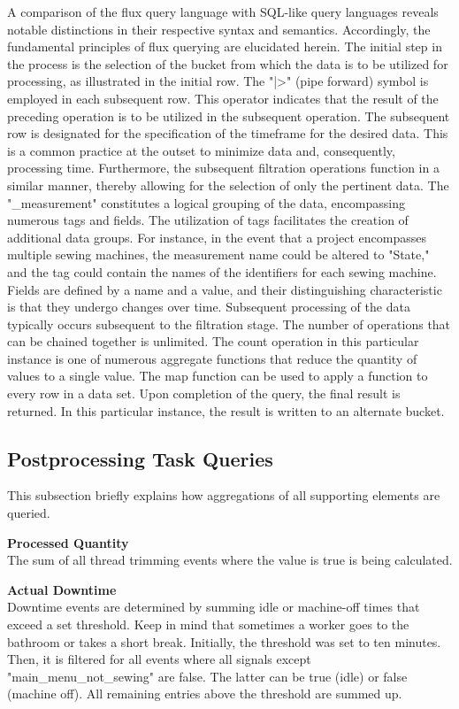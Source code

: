 A comparison of the flux query language with SQL-like query languages reveals notable distinctions in their respective syntax and semantics. Accordingly, the fundamental principles of flux querying are elucidated herein. The initial step in the process is the selection of the bucket from which the data is to be utilized for processing, as illustrated in the initial row. The "|>" (pipe forward) symbol is employed in each subsequent row. This operator indicates that the result of the preceding operation is to be utilized in the subsequent operation. The subsequent row is designated for the specification of the timeframe for the desired data. This is a common practice at the outset to minimize data and, consequently, processing time. Furthermore, the subsequent filtration operations function in a similar manner, thereby allowing for the selection of only the pertinent data. The "\_measurement" constitutes a logical grouping of the data, encompassing numerous tags and fields. The utilization of tags facilitates the creation of additional data groups. For instance, in the event that a project encompasses multiple sewing machines, the measurement name could be altered to "State," and the tag could contain the names of the identifiers for each sewing machine.  Fields are defined by a name and a value, and their distinguishing characteristic is that they undergo changes over time. Subsequent processing of the data typically occurs subsequent to the filtration stage. The number of operations that can be chained together is unlimited. The count operation in this particular instance is one of numerous aggregate functions that reduce the quantity of values to a single value. The map function can be used to apply a function to every row in a data set. Upon completion of the query, the final result is returned. In this particular instance, the result is written to an alternate bucket.

\subsection{Postprocessing Task Queries}
This subsection briefly explains how aggregations of all supporting elements are queried.

\textbf{Processed Quantity}\\
The sum of all thread trimming events where the value is true is being calculated.

\textbf{Actual Downtime}\\
Downtime events are determined by summing idle or machine-off times that exceed a set threshold. Keep in mind that sometimes a worker goes to the bathroom or takes a short break. Initially, the threshold was set to ten minutes. Then, it is filtered for all events where all signals except "main\_menu\_not\_sewing" are false. The latter can be true (idle) or false (machine off). All remaining entries above the threshold are summed up.

